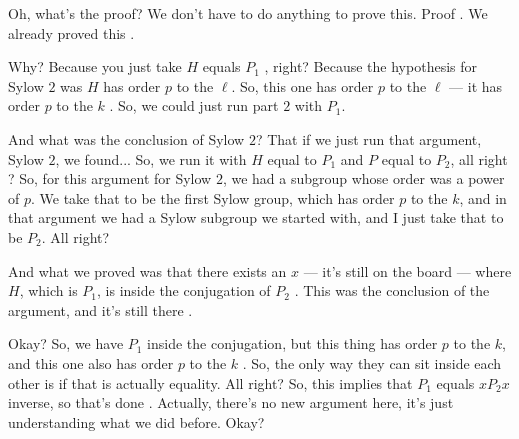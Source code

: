 \begin{proofWrapper}

\begin{speech}[00:37:26 - 00:39:23]
Oh, what's the proof? We don't have to do anything to prove this. Proof . We already proved this .

Why? Because you just take $H$ equals $P_1$ , right? Because the hypothesis for Sylow $2$ was $H$ has order $p$ to the $\ell$. So, this one has order $p$ to the $\ell$ --- it has order $p$ to the $k$ . So, we could just run part $2$ with $P_1$.

And what was the conclusion of Sylow $2$? That if we just run that argument, Sylow $2$, we found... So, we run it with $H$ equal to $P_1$ and $P$ equal to $P_2$, all right ? So, for this argument for Sylow $2$, we had a subgroup whose order was a power of $p$. We take that to be the first Sylow group, which has order $p$ to the $k$, and in that argument we had a Sylow subgroup we started with, and I just take that to be $P_2$. All right?

And what we proved was that there exists an $x$ --- it's still on the board --- where $H$, which is $P_1$, is inside the conjugation of $P_2$ . This was the conclusion of the argument, and it's still there .

Okay? So, we have $P_1$ inside the conjugation, but this thing has order $p$ to the $k$, and this one also has order $p$ to the $k$ . So, the only way they can sit inside each other is if that is actually equality. All right? So, this implies that $P_1$ equals $x P_2 x$ inverse, so that's done . Actually, there's no new argument here, it's just understanding what we did before. Okay?
\end{speech}


\end{proofWrapper}

